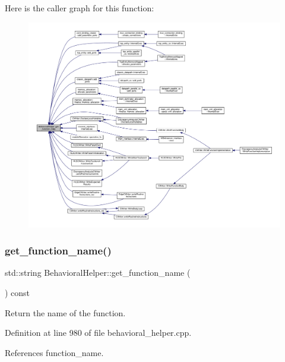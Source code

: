 Here is the caller graph for this function\+:
\nopagebreak
\begin{figure}[H]
\begin{center}
\leavevmode
\includegraphics[width=350pt]{dd/db2/classBehavioralHelper_a1ce91e3194698e93726ab8cf2f427dd0_icgraph}
\end{center}
\end{figure}
\mbox{\label{classBehavioralHelper_a7e1ca094d7e2d5b3ec825cf3a73e5f8c}} 
\subsubsection{\texorpdfstring{get\+\_\+function\+\_\+name()}{get\_function\_name()}}
{\footnotesize\ttfamily std\+::string Behavioral\+Helper\+::get\+\_\+function\+\_\+name (\begin{DoxyParamCaption}{ }\end{DoxyParamCaption}) const}



Return the name of the function. 



Definition at line 980 of file behavioral\+\_\+helper.\+cpp.



References function\+\_\+name.



